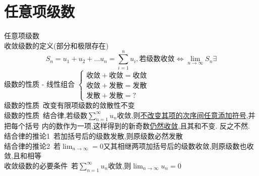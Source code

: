 \documentclass[12pt, a4paper, oneside, UTF8]{ctexbook}
\begin{document}
\section{任意项级数}
\begin{remark}
    任意项级数 \\
    收敛级数的定义(部分和极限存在) 
    $$
    S_n=u_1+u_2+\ldots u_n = \sum_{i=1}^{n}u_i, \text{若级数收敛} \iff \lim_{n\to\infty}S_n \exists
    $$
    级数的性质 - 线性组合 
    $
    \begin{cases}
        \text{收敛} + \text{收敛} = \text{收敛} \\
        \text{收敛} + \text{发散} = \text{发散} \\
        \text{发散} + \text{发散} = ? 
    \end{cases}
    $  \\
    级数的性质\ 改变有限项级数的敛散性不变 \\
    级数的性质\ 结合律,若级数$\displaystyle \sum_{n=1}^{\infty}u_n$收敛,则\underline{不改变其项的次序间任意添加符号},并把每个括号
    内的数作为一项,这样得到的新奇数\underline{仍然收敛},且其和不变. 反之不然. \\
    结合律的推论1\ 若加括号后的级数发散,则原级数必然发散 \\
    结合律的推论2\ 若$\displaystyle \lim_{n\to\infty} = 0$又其相继两项加括号后的级数收敛,则原级数也收敛,且和相等 \\
    收敛级数的必要条件\ 若$\displaystyle \sum_{n=1}^{\infty}u_n$收敛,则$\displaystyle \lim_{n\to\infty} u_n = 0$
\end{remark}
\end{document}

